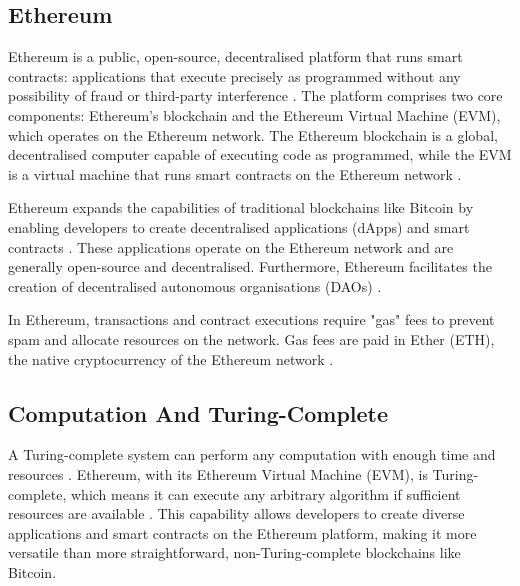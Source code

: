 \subsection{Ethereum}
Ethereum is a public, open-source, decentralised platform that runs smart contracts: applications that execute precisely as programmed without any possibility of fraud or third-party interference \cite{buterin2013ethereum}. The platform comprises two core components: Ethereum's blockchain and the Ethereum Virtual Machine (EVM), which operates on the Ethereum network. The Ethereum blockchain is a global, decentralised computer capable of executing code as programmed, while the EVM is a virtual machine that runs smart contracts on the Ethereum network \cite{wood2014ethereum}.

Ethereum expands the capabilities of traditional blockchains like Bitcoin by enabling developers to create decentralised applications (dApps) and smart contracts \cite{swan2015blockchain}. These applications operate on the Ethereum network and are generally open-source and decentralised. Furthermore, Ethereum facilitates the creation of decentralised autonomous organisations (DAOs) \cite{mougayar2016business}.

In Ethereum, transactions and contract executions require "gas" fees to prevent spam and allocate resources on the network. Gas fees are paid in Ether (ETH), the native cryptocurrency of the Ethereum network \cite{antonopoulos2018mastering}.

\subsection{Computation And Turing-Complete}
A Turing-complete system can perform any computation with enough time and resources \cite{turing1936computable}. Ethereum, with its Ethereum Virtual Machine (EVM), is Turing-complete, which means it can execute any arbitrary algorithm if sufficient resources are available \cite{buterin2013ethereum}. This capability allows developers to create diverse applications and smart contracts on the Ethereum platform, making it more versatile than more straightforward, non-Turing-complete blockchains like Bitcoin.

